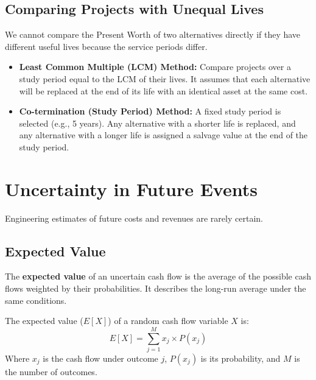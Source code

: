 \documentclass[12pt,a4paper]{article}
\begin{document}
\subsection{Comparing Projects with Unequal Lives}
We cannot compare the Present Worth of two alternatives directly if they have different useful lives because the service periods differ.
\begin{itemize}[leftmargin=*, itemsep=6pt]
  \item \textbf{Least Common Multiple (LCM) Method:} Compare projects over a study period equal to the LCM of their lives. It assumes that each alternative will be replaced at the end of its life with an identical asset at the same cost.
  \item \textbf{Co-termination (Study Period) Method:} A fixed study period is selected (e.g., 5 years). Any alternative with a shorter life is replaced, and any alternative with a longer life is assigned a salvage value at the end of the study period.
\end{itemize}

\section{Uncertainty in Future Events}

Engineering estimates of future costs and revenues are rarely certain.

\subsection{Expected Value}
\begin{tcolorbox}[defbox, title={Expected Value}]
The \textbf{expected value} of an uncertain cash flow is the average of the possible cash flows weighted by their probabilities. It describes the long-run average under the same conditions.
\end{tcolorbox}

\begin{tcolorbox}[formulabox, title={\textbf{Expected Value Formula}}]
The expected value ($E[X]$) of a random cash flow variable $X$ is:
\begin{equation}
  E[X] = \sum_{j=1}^{M} x_j \times P(x_j)
\end{equation}
Where $x_j$ is the cash flow under outcome $j$, $P(x_j)$ is its probability, and $M$ is the number of outcomes.
\end{tcolorbox}
\end{document}
